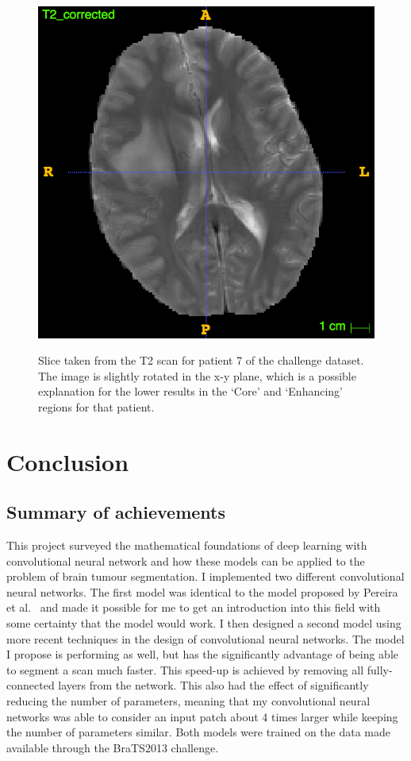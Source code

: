 \documentclass[12pt,a4paper,twoside,openright]{report}
\begin{document}
\begin{figure}[h]
	\centering
	\includegraphics[scale = 0.3]{patient7_t2}
	\label{fig:patient_7_t2}
	\caption{Slice taken from the T2 scan for patient 7 of the challenge dataset. The image is slightly rotated in the x-y plane, which is a possible explanation for the lower results in the `Core' and `Enhancing' regions for that patient.}
\end{figure}

\chapter{Conclusion}
\section{Summary of achievements}
This project surveyed the mathematical foundations of deep learning with convolutional neural network and how these models can be applied to the problem of brain tumour segmentation. I implemented two different convolutional neural networks. The first model was identical to the model proposed by Pereira et al.\ \cite{Pereira} and made it possible for me to get an introduction into this field with some certainty that the model would work. I then designed a second model using more recent techniques in the design of convolutional neural networks. The model I propose is performing as well, but has the significantly advantage of being able to segment a scan much faster. This speed-up is achieved by removing all fully-connected layers from the network. This also had the effect of significantly reducing the number of parameters, meaning that my convolutional neural networks was able to consider an input patch about 4 times larger while keeping the number of parameters similar. Both models were trained on the data made available through the BraTS2013 challenge.
\end{document}
